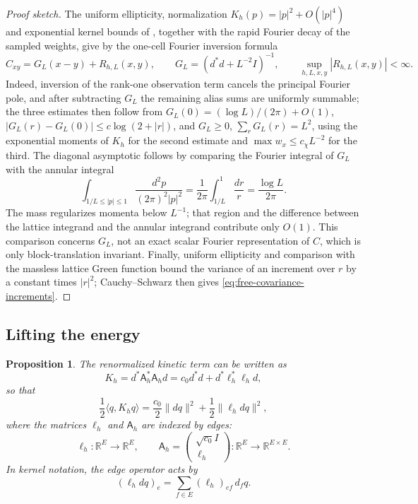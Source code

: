 \documentclass[11pt]{article}
\newcommand{\R}{\mathbb R}
\newcommand{\Id}{I}
\numberwithin{equation}{section}
\newtheorem{proposition}[theorem]{Proposition}
\theoremstyle{definition}
\theoremstyle{plain}
\begin{document}
\begin{proof}[Proof sketch]
The uniform ellipticity, normalization $K_h(p)=|p|^2+O(|p|^4)$
and exponential kernel bounds of \cite[Section~4.2]{OpenAI-O3},
together with the rapid Fourier decay of the sampled weights,
give by the one-cell Fourier inversion formula
\begin{equation}
 C_{xy}=G_L(x-y)+R_{h,L}(x,y),\qquad
 G_L=(d^*d+L^{-2}\Id)^{-1},\qquad
 \sup_{h,L,x,y}|R_{h,L}(x,y)|<\infty.
 \label{eq:free-massive-comparison}
\end{equation}
Indeed, inversion of the rank-one observation term cancels the
principal Fourier pole, and after subtracting $G_L$ the remaining
alias sums are uniformly summable; the three estimates then follow from
$G_L(0)=(\log L)/(2\pi)+O(1)$,
$|G_L(r)-G_L(0)|\le c\log(2+|r|)$, and
$G_L\ge0$, $\sum_rG_L(r)=L^2$, using the exponential moments
of $K_h$ for the second estimate and $\max w_x\le c_\chi L^{-2}$
for the third.  The diagonal asymptotic follows by comparing the
Fourier integral of $G_L$ with the annular integral
\begin{equation}
 \int_{1/L\leq |p|\leq1}
       \frac{d^2p}{(2\pi)^2|p|^2}
   =\frac1{2\pi}\int_{1/L}^1\frac{dr}{r}
   =\frac{\log L}{2\pi}.
 \label{eq:geom-shell-log}
\end{equation}
The mass regularizes momenta below $L^{-1}$; that region and
the difference between the lattice integrand and the annular
integrand contribute only $O(1)$.  This comparison concerns
$G_L$, not an exact scalar Fourier representation of $C$,
which is only block-translation invariant.
Finally, uniform ellipticity and comparison with the massless
lattice Green function bound the variance of an increment
over $r$ by a constant times $|r|^2$; Cauchy--Schwarz then gives
\eqref{eq:free-covariance-increments}.
\end{proof}


\subsection{Lifting the energy}

\begin{proposition}
The renormalized kinetic term can be written as 
\begin{equation}
 K_h
 =d^* \mathsf A_h^* \mathsf A_h d
 = c_0d^*d+d^*\ell_h^*\ell_hd,
\end{equation}
so that
\begin{equation}
\frac12\langle q,K_hq\rangle
=\frac{c_0}{2}\|dq\|^2+\frac12\|\ell_hdq\|^2,
\end{equation}
where the matrices $\ell_h$ and $\mathsf A_h$ are indexed by edges:
\begin{equation}
  \ell_h : \R^E \to \R^E,
  \qquad
  \mathsf A_h = \begin{pmatrix} \sqrt{c_0} I \\\ \ell_h \end{pmatrix} : \R^E \to \R^{E\times E}.
\end{equation}
In kernel notation, the edge operator acts by
\begin{equation}
 (\ell_h dq)_e=\sum_{f\in E}(\ell_h)_{ef}\,d_fq.
\end{equation}
\end{proposition}
\end{document}
